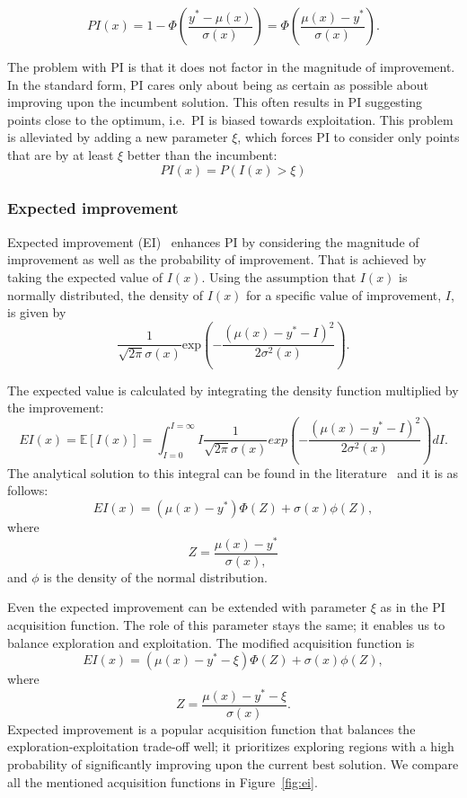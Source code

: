 \[
    PI(x) = 1 - \Phi\left(\frac{y^*-\mu(x)}{\sigma(x)}\right) = \Phi\left(\frac{\mu(x)-y^*}{\sigma(x)}\right).
\]

The problem with PI is that it does not factor in the magnitude of improvement. In the standard form, PI cares only about being as certain as possible about improving upon the incumbent solution. This often results in PI suggesting points close to the optimum, i.e.\ PI is biased towards exploitation. This problem is alleviated by adding a new parameter $\xi$, which forces PI to consider only points that are by at least $\xi$ better than the incumbent:
\[
    PI(x)=P(I(x)>\xi)
\]

\subsubsection{Expected improvement}
Expected improvement (EI)~\cite{jones1998efficient} enhances PI by considering the magnitude of improvement as well as the probability of improvement. That is achieved by taking the expected value of $I(x)$. Using the assumption that $I(x)$ is normally distributed, the density of $I(x)$ for a specific value of improvement, $I$, is given by
\[
\frac{1}{\sqrt{2 \pi}\sigma(x)} \text{exp}\left(-\frac{(\mu(x)-y^*-I)^2}{2\sigma^2(x)}\right).
\]

The expected value is calculated by integrating the density function multiplied by the improvement:
\[ EI(x) = \mathbb{E}[I(x)] = \int_{I=0}^{I=\infty} I\frac{1}{\sqrt{2 \pi}\sigma(x)} exp\left(-\frac{(\mu(x)-y^*-I)^2}{2\sigma^2(x)}\right) dI. \]
The analytical solution to this integral can be found in the literature~\cite{jones1998efficient} and it is as follows:
\[ EI(x) = (\mu(x)-y^*)\Phi(Z)+\sigma(x)\phi(Z), \]
where
\[ Z=\frac{\mu(x)-y^*}{\sigma(x),} \]
and $\phi$ is the density of the normal distribution.

Even the expected improvement can be extended with parameter $\xi$ as in the PI acquisition function. The role of this parameter stays the same; it enables us to balance exploration and exploitation. The modified acquisition function is
\[
EI(x) = (\mu(x)-y^*-\xi)\Phi(Z)+\sigma(x)\phi(Z), \]
where
\[ Z=\frac{\mu(x)-y^*-\xi}{\sigma(x)}. \]
 Expected improvement is a popular acquisition function that balances the exploration-exploitation trade-off well; it prioritizes exploring regions with a high probability of significantly improving upon the current best solution. We compare all the mentioned acquisition functions in Figure~\ref{fig:ei}.

